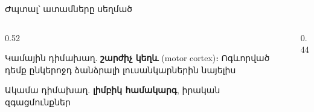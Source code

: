 \begin{frame}{Ժպտալ՝ ատամները սեղմած}
  \begin{columns}[c]
    \begin{column}{0.52\textwidth}
      \begin{card}[colback=mint!35!cardwhite]
        {\blackfont Կամային} դիմախաղ. \textbf{շարժիչ կեղև} (motor cortex)։ Ոգևորված դեմք ընկերոջդ ձանձրալի լուսանկարներին նայելիս
      \end{card}
      \begin{card}[colback=peach!35!cardwhite]
        {\blackfont Ակամա} դիմախաղ. \textbf{լիմբիկ համակարգ}, իրական զգացմունքներ
      \end{card}
    \end{column}
    \begin{column}{0.44\textwidth}
      \centering
    \end{column}
  \end{columns}
\end{frame}
